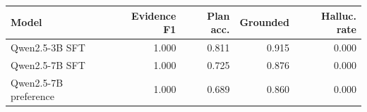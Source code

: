 \begin{tabular}{lrrrr}
\toprule
Model & Evidence F1 & Plan acc. & Grounded & Halluc. rate \\
\midrule
Qwen2.5-3B SFT & 1.000 & 0.811 & 0.915 & 0.000 \\
Qwen2.5-7B SFT & 1.000 & 0.725 & 0.876 & 0.000 \\
Qwen2.5-7B preference & 1.000 & 0.689 & 0.860 & 0.000 \\
\bottomrule
\end{tabular}
